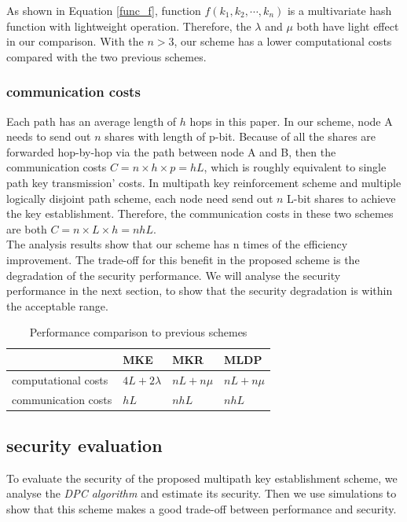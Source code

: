 \documentclass[nocopyrightspace,9pt]{sigplanconf}
\begin{document}
As shown in Equation \ref{func_f}, function $f(k_1,k_2,\cdots,k_n)$ is a multivariate hash function with lightweight operation. Therefore, the $\lambda$ and $\mu$ both have light effect in our comparison.
With the $n>3$, our scheme has a lower computational costs compared with the two previous schemes.

\subsubsection*{communication costs}
Each path has an average length of $h$ hops in this paper. In our scheme, node A needs to send
out $n$ shares with length of p-bit. Because of all the shares are forwarded hop-by-hop via
the path between node A and B, then the communication costs $C=n\times h \times p=hL$, which is
roughly equivalent to single path key transmission' costs.
In multipath key reinforcement scheme and multiple logically disjoint path scheme, each node need
send out $n$ L-bit shares to achieve the key establishment. Therefore, the communication costs
in these two schemes are both $C=n\times L \times h=nhL$.\\

The analysis results show that our scheme has n times of the efficiency improvement.
The trade-off for this benefit in the proposed scheme is the degradation of the security performance.
We will analyse the security performance in the next section, to show that the security degradation
is within the acceptable range.

\begin{table}[htbp]
\caption{Performance comparison to previous schemes}
\begin{tabular}{|p{9em}|p{4em}|p{4em}|p{4em}|}

  \hline
    & MKE & MKR & MLDP\\ \hline
  computational costs & $4L+2\lambda$ & $nL+n\mu$ & $nL+n\mu$\\  \hline
  communication costs & $hL$ & $nhL$ & $nhL$\\  \hline
\end{tabular}
\label{tb:performance}
\end{table}
\subsection{security evaluation}
To evaluate the security of the proposed multipath key establishment scheme, we
analyse the \textit{DPC algorithm} and estimate its security.
Then we use simulations to show that this scheme makes a good trade-off between
performance and security.
\end{document}
